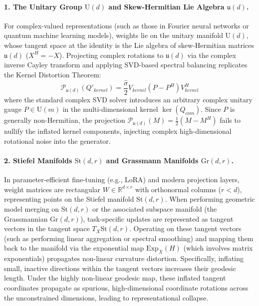 \paragraph{1. The Unitary Group $\mathrm{U}(d)$ and Skew-Hermitian Lie Algebra $\mathfrak{u}(d)$.}
For complex-valued representations (such as those in Fourier neural networks or quantum machine learning models), weights lie on the unitary manifold $\mathrm{U}(d)$, whose tangent space at the identity is the Lie algebra of skew-Hermitian matrices $\mathfrak{u}(d)$ ($X^H = -X$). Projecting complex rotations to $\mathfrak{u}(d)$ via the complex inverse Cayley transform and applying SVD-based spectral balancing replicates the Kernel Distortion Theorem:
\begin{equation}
\mathcal{P}_{\mathfrak{u}(d)}(Q'_{kernel}) = \frac{\hat{\sigma}}{2} V_{kernel} (P - P^H) V_{kernel}^H
\end{equation}
where the standard complex SVD solver introduces an arbitrary complex unitary gauge $P \in \mathrm{U}(m)$ in the multi-dimensional kernel $\ker(Q_{com})$. Since $P$ is generally non-Hermitian, the projection $\mathcal{P}_{\mathfrak{u}(d)}(M) = \frac{1}{2}(M - M^H)$ fails to nullify the inflated kernel components, injecting complex high-dimensional rotational noise into the generator.

\paragraph{2. Stiefel Manifolds $\mathrm{St}(d, r)$ and Grassmann Manifolds $\mathrm{Gr}(d, r)$.}
In parameter-efficient fine-tuning (e.g., LoRA) and modern projection layers, weight matrices are rectangular $W \in \mathbb{R}^{d \times r}$ with orthonormal columns ($r < d$), representing points on the Stiefel manifold $\mathrm{St}(d, r)$. When performing geometric model merging on $\mathrm{St}(d, r)$ or the associated subspace manifold (the Grassmannian $\mathrm{Gr}(d, r)$), task-specific updates are represented as tangent vectors in the tangent space $T_X \mathrm{St}(d, r)$. 
Operating on these tangent vectors (such as performing linear aggregation or spectral smoothing) and mapping them back to the manifold via the exponential map $\mathrm{Exp}_X(H)$ (which involves matrix exponentials) propagates non-linear curvature distortion. Specifically, inflating small, inactive directions within the tangent vectors increases their geodesic length. Under the highly non-linear geodesic map, these inflated tangent coordinates propagate as spurious, high-dimensional coordinate rotations across the unconstrained dimensions, leading to representational collapse.

